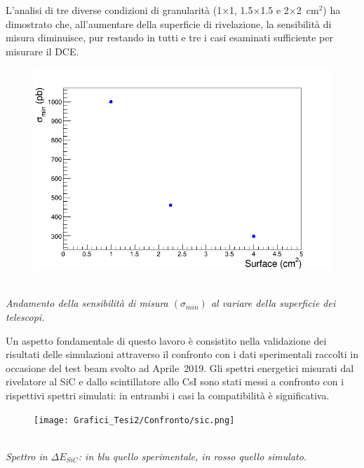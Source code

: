 \documentclass[10pt,foldmark,notumble]{leaflet}
\begin{document}
L'analisi di tre diverse condizioni di granularità (1$\times$1, 1.5$\times$1.5 e 2$\times$2~$\mbox{cm}^2$) ha dimostrato che, all'aumentare della superficie di rivelazione, la sensibilità di misura diminuisce, pur restando in tutti e tre i casi esaminati sufficiente per misurare il DCE.\\
\begin{figure} [!h]
	\centering
	\includegraphics[width=0.75\columnwidth, keepaspectratio]{Grafici_Tesi2/Granularitanew/sigma_min.png}
\end{figure}\\
\textit{Andamento della sensibilità di misura $(\sigma_{min})$ al variare della superficie dei telescopi.}

Un aspetto fondamentale di questo lavoro è consistito nella validazione dei risultati delle simulazioni attraverso il confronto con i dati sperimentali raccolti in occasione del test beam svolto ad Aprile~2019.
Gli spettri energetici misurati dal rivelatore al SiC e dallo scintillatore allo CsI sono stati messi a confronto con i rispettivi spettri simulati: in entrambi i casi la compatibilità è significativa.\\
\begin{figure} [!h]
	\centering
	\texttt{[image: Grafici\_Tesi2/Confronto/sic.png]}
\end{figure}\\
\textit{Spettro in $\Delta E_{SiC}$: in blu quello sperimentale, in rosso quello simulato.}
\end{document}
